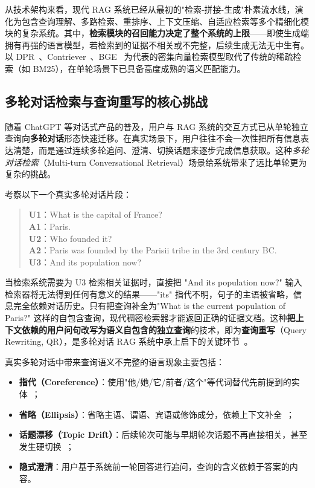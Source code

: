 从技术架构来看，现代 RAG 系统已经从最初的"检索-拼接-生成"朴素流水线，演化为包含查询理解、多路检索、重排序、上下文压缩、自适应检索等多个精细化模块的复杂系统。其中，\textbf{检索模块的召回能力决定了整个系统的上限}——即使生成端拥有再强的语言模型，若检索到的证据不相关或不完整，后续生成无法无中生有。以 DPR~\citep{karpukhin-etal-2020-dense}、Contriever~\citep{izacard2022contriever}、BGE~\citep{xiao2023cpack} 为代表的密集向量检索模型取代了传统的稀疏检索（如 BM25），在单轮场景下已具备高度成熟的语义匹配能力。

\subsection{多轮对话检索与查询重写的核心挑战}

随着 ChatGPT 等对话式产品的普及，用户与 RAG 系统的交互方式已从单轮独立查询向\textbf{多轮对话}形态快速迁移。在真实场景下，用户往往不会一次性把所有信息表达清楚，而是通过连续多轮追问、澄清、切换话题来逐步完成信息获取。这种\textit{多轮对话检索}（Multi-turn Conversational Retrieval）场景给系统带来了远比单轮更为复杂的挑战。

考察以下一个真实多轮对话片段：

\begin{quote}
\textbf{U1}：What is the capital of France? \\
\textbf{A1}：Paris. \\
\textbf{U2}：Who founded it? \\
\textbf{A2}：Paris was founded by the Parisii tribe in the 3rd century BC. \\
\textbf{U3}：And its population now?
\end{quote}

当检索系统需要为 U3 检索相关证据时，直接把 "And its population now?" 输入检索器将无法得到任何有意义的结果——"its" 指代不明，句子的主语被省略，信息完全依赖对话历史。只有把查询补全为"What is the current population of Paris?" 这样的自包含查询，现代稠密检索器才能返回正确的证据文档。这种\textbf{把上下文依赖的用户问句改写为语义自包含的独立查询}的技术，即为\textbf{查询重写}（Query Rewriting, QR），是多轮对话 RAG 系统中承上启下的关键环节~\citep{mo2024convsar}。

真实多轮对话中带来查询语义不完整的语言现象主要包括：
\begin{itemize}
\item \textbf{指代（Coreference）}：使用"他/她/它/前者/这个"等代词替代先前提到的实体~\citep{lee2017coref}；
\item \textbf{省略（Ellipsis）}：省略主语、谓语、宾语或修饰成分，依赖上下文补全~\citep{halliday1976cohesion,quan2019gecor}；
\item \textbf{话题漂移（Topic Drift）}：后续轮次可能与早期轮次话题不再直接相关，甚至发生硬切换~\citep{adlakha-etal-2022-topiocqa}；
\item \textbf{隐式澄清}：用户基于系统前一轮回答进行追问，查询的含义依赖于答案的内容。
\end{itemize}

